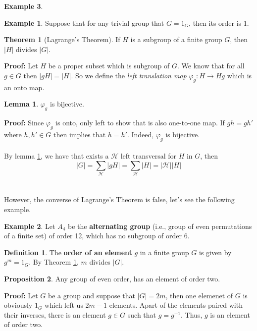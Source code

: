 \documentclass[11pt]{amsbook}%
\theoremstyle{plain}
\theoremstyle{definition}
\newtheorem{definition*}{Definition}
\newtheorem*{example*}{Example}
\newtheorem{lemma}{Lemma}
\newtheorem{proposition}[theorem]{Proposition}
\newtheorem{theorem}{Theorem}
\numberwithin{equation}{section}
\newcommand{\HC}{\mathcal H}
\begin{document}
\begin{example*}
\begin{example*}
  Suppose that for any trivial group that $G = 1_{G}$, then its order is 1.
\end{example*}

\begin{theorem}[Lagrange's Theorem]
  \label{theo-lagrange}
  If $H$ is a subgroup of a finite group $G$, then $|H|$ divides $|G|$.
\end{theorem} \vspace{1.8em}
\textbf{Proof: }Let $H$ be a proper subset which is subgroup of $G$.
We know that for all $g \in G$ then $|gH| = |H|$. So
we define the \textit{left translation map} $\varphi_{g}: H \longrightarrow Hg$
which is an onto map.

\begin{lemma}
  \label{lemm-2}
  $\varphi_{g}$ is bijective.
\end{lemma} \vspace{1.8em}
\textbf{Proof: } Since $\varphi_{g}$ is onto, only left to show that is also
one-to-one map. If $gh = gh'$ where $h, h' \in G$ then implies
that $h = h'$. Indeed, $\varphi_{g}$ is bijective. \qedsymbol \\ \\
By lemma \ref{lemm-2}, we have that exists a $\HC$ left
transversal for $H$ in $G$, then
$$
|G| = \sum_{\HC} |gH| = \sum_{\HC} |H| = |\HC||H|
$$
\qedsymbol \\ \\
However, the converse of Lagrange's Theorem is false, let's see
the following example.
\begin{example*}
  Let $A_{4}$ be the \textbf{alternating group} (i.e., group of even permutations of a finite set)
  of order 12, which has no subgroup of order 6.
\end{example*}

\begin{definition*}
  The \textbf{order of an element} $g$ in a finite group $G$ is given by
  $g^{m} = 1_{G}$. By Theorem \ref{theo-lagrange}, $m$ divides
  $|G|$.
\end{definition*}

\begin{proposition}
  Any group of even order, has an element of order two.
\end{proposition} \vspace{1.8em}
\textbf{Proof: } Let $G$ be a group and suppose that $|G| = 2m$, then
one elemenet of $G$ is obviously $1_{G}$ which left us
$2m - 1$ elements. Apart of the elements paired with their
inverses, there is an element $g \in G$ such that $g = g^{-1}$.
Thus, $g$ is an element of order two. \qedsymbol


\end{example*}
\end{document}
